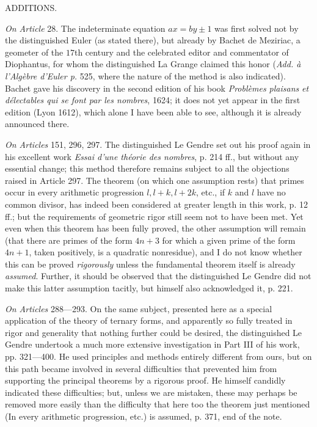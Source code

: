 \clearpage
{}


\begin{center}ADDITIONS.\end{center}
\textit{On Article} 28. The indeterminate equation \(ax=by\pm1\) was first solved not by the distinguished Euler (as stated there), but already by Bachet de Meziriac, a geometer of the \(17\)th century and the celebrated editor and commentator of Diophantus, for whom the distinguished La Grange claimed this honor (\textit{Add. à l'Algèbre d'Euler p.} 525, where the nature of the method is also indicated). Bachet gave his discovery in the second edition of his book \textit{Problèmes plaisans} \textit{et délectables qui se font par les nombres}, 1624; it does not yet appear in the first edition (Lyon 1612), which alone I have been able to see, although it is already announced there.

\textit{On Articles} 151, 296, 297. The distinguished Le Gendre set out his proof again in his excellent work \textit{Essai d'une théorie des nombres}, p. 214 ff., but without any essential change; this method therefore remains subject to all the objections raised in Article 297. The theorem (on which one assumption rests) that primes occur in every arithmetic progression \(l,\allowbreak l+k,\allowbreak l+2k\), etc., if \(k\) and \(l\) have no common divisor, has indeed been considered at greater length in this work, p. 12 ff.; but the requirements of geometric rigor still seem not to have been met. Yet even when this theorem has been fully proved, the other assumption will remain (that there are primes of the form \(4n+3\) for which a given prime of the form \(4n+1\), taken positively, is a quadratic nonresidue), and I do not know whether this can be proved \textit{rigorously} unless the fundamental theorem itself is already \textit{assumed}. Further, it should be observed that the distinguished Le Gendre did not make this latter assumption tacitly, but himself also acknowledged it, p. 221.

\textit{On Articles} 288---293. On the same subject, presented here as a special application of the theory of ternary forms, and apparently so fully treated in rigor and generality that nothing further could be desired, the distinguished Le Gendre undertook a much more extensive investigation in Part III of his work, pp. 321---400. He used principles and methods entirely different from ours, but on this path became involved in several difficulties that prevented him from supporting the principal theorems by a rigorous proof. He himself candidly indicated these difficulties; but, unless we are mistaken, these may perhaps be removed more easily than the difficulty that here too the theorem just mentioned (In every arithmetic progression, etc.) is assumed, p. 371, end of the note.

